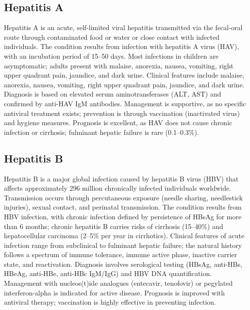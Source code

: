 \subsection{Hepatitis A}
\label{sec:Hepatitis A}
Hepatitis A is an acute, self-limited viral hepatitis transmitted via the fecal-oral route through contaminated food or water or close contact with infected individuals. The condition results from infection with hepatitis A virus (HAV), with an incubation period of 15--50 days. Most infections in children are asymptomatic; adults present with malaise, anorexia, nausea, vomiting, right upper quadrant pain, jaundice, and dark urine. Clinical features include malaise, anorexia, nausea, vomiting, right upper quadrant pain, jaundice, and dark urine. Diagnosis is based on elevated serum aminotransferases (ALT, AST) and confirmed by anti-HAV IgM antibodies. Management is supportive, as no specific antiviral treatment exists; prevention is through vaccination (inactivated virus) and hygiene measures. Prognosis is excellent, as HAV does not cause chronic infection or cirrhosis; fulminant hepatic failure is rare (0.1--0.3\%).

\subsection{Hepatitis B}
\label{sec:Hepatitis B}
Hepatitis B is a major global infection caused by hepatitis B virus (HBV) that affects approximately 296 million chronically infected individuals worldwide. Transmission occurs through percutaneous exposure (needle sharing, needlestick injuries), sexual contact, and perinatal transmission. The condition results from HBV infection, with chronic infection defined by persistence of HBsAg for more than 6 months; chronic hepatitis B carries risks of cirrhosis (15--40\%) and hepatocellular carcinoma (2--5\% per year in cirrhotics). Clinical features of acute infection range from subclinical to fulminant hepatic failure; the natural history follows a spectrum of immune tolerance, immune active phase, inactive carrier state, and reactivation. Diagnosis involves serological testing (HBsAg, anti-HBs, HBeAg, anti-HBe, anti-HBc IgM/IgG) and HBV DNA quantification. Management with nucleos(t)ide analogues (entecavir, tenofovir) or pegylated interferon-alpha is indicated for active disease. Prognosis is improved with antiviral therapy; vaccination is highly effective in preventing infection.

